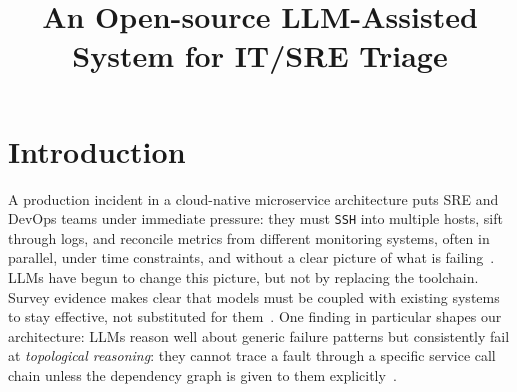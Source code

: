 \documentclass[conference]{IEEEtran}
\begin{document}
\title{An Open-source LLM-Assisted System for IT/SRE Triage }

\makeatletter
\newcommand{\linebreakand}{%
  \end{@IEEEauthorhalign}
  \hfill\mbox{}\par
  \mbox{}\hfill\begin{@IEEEauthorhalign}
}
\makeatother



\author{
\and

\and
{}
}


\maketitle
\begin{abstract}

\end{abstract}

\begin{IEEEkeywords}

\end{IEEEkeywords}
\section{Introduction}
A production incident in a cloud-native microservice architecture puts SRE and DevOps teams
under immediate pressure: they must \texttt{SSH} into multiple hosts, sift through logs, and
reconcile metrics from different monitoring systems, often in parallel, under time constraints,
and without a clear picture of what is failing~\cite{zhang2025aiops_survey, chen2024rcacopilot}.
LLMs have begun to change this picture, but not by replacing the toolchain. Survey evidence
makes clear that models must be coupled with existing systems to stay effective, not substituted
for them~\cite{zhang2025aiops_survey, szandala2025aiops_reliability}. One finding in particular
shapes our architecture: LLMs reason well about generic failure patterns but consistently fail
at \emph{topological reasoning}: they cannot trace a fault through a specific service call chain
unless the dependency graph is given to them explicitly~\cite{xu2025openrca}.
\end{document}
